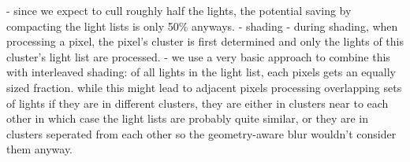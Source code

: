             - since we expect to cull roughly half the lights, the potential saving by compacting the light lists is only 50\% anyways.
    - shading
        - during shading, when processing a pixel, the pixel's cluster is first determined and only the lights of this cluster's light list are processed.
        - we use a very basic approach to combine this with interleaved shading: of all lights in the light list, each pixels gets an equally sized fraction. while this might lead to adjacent pixels processing overlapping sets of lights if they are in different clusters, they are either in clusters near to each other in which case the light lists are probably quite similar, or they are in clusters seperated from each other so the geometry-aware blur wouldn't consider them anyway.
